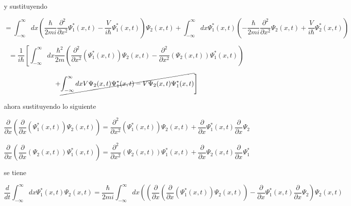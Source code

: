 \documentclass[12pt,a4paper]{article}
\begin{document}
\begin{enumerate}
    y sustituyendo 
    
    \begin{equation*}
        = \int_{-\infty}^{\infty} dx (\frac{\hbar}{2mi} \frac{\partial^2}{\partial x^2} \Psi_1^* (x,t)- \frac{V}{i\hbar} \Psi_1^*(x,t)) \Psi_2 (x,t) + \int_{-\infty}^{\infty} dx \Psi_{1}^{*} (x,t) (-\frac{\hbar}{2mi} \frac{\partial^2}{\partial x^2} \Psi_2 (x,t) + \frac{V}{i \hbar} \Psi_2^* (x,t)
        )
    \end{equation*}
    
    \begin{equation*}
        =\frac{1}{i\hbar} \left[ \int_{-\infty}^{\infty} dx \frac{\hbar^2}{2m}\left( \frac{\partial^2}{\partial x^2} (\Psi^*_1(x,t)) \Psi_2 (x,t)- \frac{\partial^2}{\partial x^2} (\Psi_2 (x,t)) \Psi^*_1 (x,t)\right) \right.
    \end{equation*}
    
    \begin{equation*}
        \left. + \cancel{ \int_{-\infty}^{\infty} dx V \Psi_2 (x,t) \Psi^*_1(x,t) - V \Psi_2 (x,t) \Psi^*_1(x,t)}\right]
    \end{equation*}
    
    ahora sustituyendo lo siguiente
    
    \begin{equation*}
        \frac{\partial }{\partial x} (\frac{\partial}{\partial x}(\Psi^*_1(x,t))\Psi_2(x,t))= \frac{\partial^2}{\partial x^2} (\Psi^*_1(x,t)) \Psi_2 (x,t) + \frac{\partial}{\partial x} \Psi^*_1 (x,t) \frac{\partial}{\partial x} \Psi_2
     \end{equation*}
    
    \begin{equation*}
        \frac{\partial }{\partial x} (\frac{\partial}{\partial x}(\Psi_2(x,t))\Psi^*_1(x,t)) = \frac{\partial^2}{\partial x^2} (\Psi_2(x,t)) \Psi^*_1 (x,t) + \frac{\partial}{\partial x} \Psi_2 (x,t) \frac{\partial}{\partial x} \Psi^*_1
    \end{equation*}
    
    se tiene
    
    \begin{equation*}
        \frac{d}{d t} \int_{-\infty}^{\infty} dx \Psi_{1}^{*} (x,t) \Psi_2 (x,t) = \frac{\hbar}{2mi}  \int_{-\infty}^{\infty} dx \left((\frac{\partial }{\partial x} (\frac{\partial}{\partial x}(\Psi^*_1(x,t))\Psi_2(x,t)) - \frac{\partial}{\partial x} \Psi^*_1 (x,t) \frac{\partial}{\partial x} \Psi_2)  \Psi_2 (x,t)\right.
    \end{equation*}
    

\end{enumerate}
\end{document}
